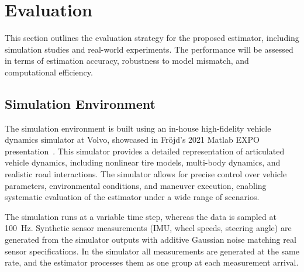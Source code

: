 \documentclass[conference]{IEEEtran}
\begin{document}
\section{Evaluation}
\label{sec:experiments}
This section outlines the evaluation strategy for the proposed estimator, including simulation studies and real-world experiments. The performance will be assessed in terms of estimation accuracy, robustness to model mismatch, and computational efficiency.

\subsection{Simulation Environment}
The simulation environment is built using an in-house high-fidelity vehicle dynamics simulator at Volvo, showcased in Fröjd's 2021 Matlab EXPO presentation~\cite{frojd_handling_2021}. This simulator provides a detailed representation of articulated vehicle dynamics, including nonlinear tire models, multi-body dynamics, and realistic road interactions. The simulator allows for precise control over vehicle parameters, environmental conditions, and maneuver execution, enabling systematic evaluation of the estimator under a wide range of scenarios.

The simulation runs at a variable time step, whereas the data is sampled at 100~Hz. Synthetic sensor measurements (IMU, wheel speeds, steering angle) are generated from the simulator outputs with additive Gaussian noise matching real sensor specifications. In the simulator all measurements are generated at the same rate, and the estimator processes them as one group at each measurement arrival.

\end{document}
